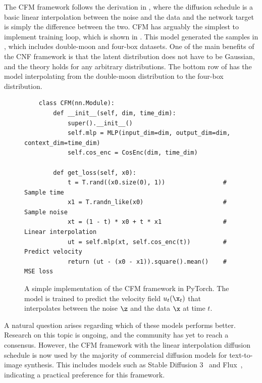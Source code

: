 The CFM framework follows the derivation in , where the diffusion schedule is a basic linear interpolation between the noise and the data and the network target is simply the difference between the two.
CFM has arguably the simplest to implement training loop, which is shown in .
This model generated the samples in , which includes double-moon and four-box datasets.
One of the main benefits of the CNF framework is that the latent distribution does not have to be Gaussian, and the theory holds for any arbitrary distributions.
The bottom row of  has the model interpolating from the double-moon distribution to the four-box distribution.

\begin{figure}
    \centering
    \scriptsize
    \begin{verbatim}
    class CFM(nn.Module):
        def __init__(self, dim, time_dim):
            super().__init__()
            self.mlp = MLP(input_dim=dim, output_dim=dim, context_dim=time_dim)
            self.cos_enc = CosEnc(dim, time_dim)

        def get_loss(self, x0):
            t = T.rand((x0.size(0), 1))                # Sample time
            x1 = T.randn_like(x0)                      # Sample noise
            xt = (1 - t) * x0 + t * x1                 # Linear interpolation
            ut = self.mlp(xt, self.cos_enc(t))         # Predict velocity
            return (ut - (x0 - x1)).square().mean()    # MSE loss
    \end{verbatim}
    \caption{A simple implementation of the CFM framework in PyTorch. The model is trained to predict the velocity field $u_t(\x_t)$ that interpolates between the noise $\z$ and the data $\x$ at time $t$.}
    \label{code:cfm}
\end{figure}

A natural question arises regarding which of these models performs better.
Research on this topic is ongoing, and the community has yet to reach a consensus.
However, the CFM framework with the linear interpolation diffusion schedule is now used by the majority of commercial diffusion models for text-to-image synthesis.
This includes models such as Stable Diffusion 3~\cite{SD3} and Flux~\cite{flux2024github}, indicating a practical preference for this framework.

